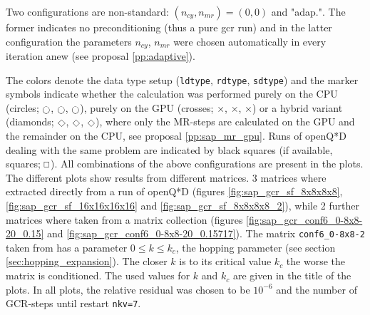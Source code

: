 \documentclass{article}
\DeclareRobustCommand{\diamond}{%
  \mathbin{\text{\scalebox{.75}{\rotatebox[origin=c]{45}{$\Box$}}}}%
}
\DeclareRobustCommand{\msquare}{%
  \mathbin{\text{\scalebox{.75}{$\Box$}}}%
}
\DeclareRobustCommand{\mcirc}{%
  \mathbin{\text{\scalebox{.75}{$\bigcirc$}}}%
}
\theoremstyle{plain} %
\theoremstyle{convention} %
\theoremstyle{remark} %
\def\code#1{\texttt{#1}}
\numberwithin{equation}{section}
\begin{document}
Two configurations are non-standard: $(n_{cy}, n_{mr}) = (0,0)$ and "adap.". The former indicates no preconditioning (thus a pure \acrshort{gcr} run) and in the latter configuration the parameters $n_{cy}$, $n_{mr}$ were chosen automatically in every iteration anew (see proposal \ref{pp:adaptive}).


The colors denote the data type setup (\code{ldtype}, \code{rdtype}, \code{sdtype}) and the marker symbols indicate whether the calculation was performed purely on the CPU (circles; \textcolor{cbrown}{$\mcirc$}, \textcolor{cred}{$\mcirc$}, \textcolor{cblue}{$\mcirc$}), purely on the GPU (crosses; \textcolor{cbrown}{$\times$}, \textcolor{cred}{$\times$}, \textcolor{cblue}{$\times$}) or a hybrid variant (diamonds; \textcolor{cbrown}{$\diamond$}, \textcolor{cred}{$\diamond$}, \textcolor{cblue}{$\diamond$}), where only the MR-steps are calculated on the GPU and the remainder on the CPU, see proposal \ref{pp:sap_mr_gpu}. Runs of openQ*D dealing with the same problem are indicated by black squares (if available, squares; $\msquare$). All combinations of the above configurations are present in the plots. The different plots show results from different matrices. \num{3} matrices where extracted directly from a run of openQ*D (figures \ref{fig:sap_gcr_sf_8x8x8x8}, \ref{fig:sap_gcr_sf_16x16x16x16} and \ref{fig:sap_gcr_sf_8x8x8x8_2}), while \num{2} further matrices where taken from a matrix collection \cite{davis2011} (figures \ref{fig:sap_gcr_conf6_0-8x8-20_0.15} and \ref{fig:sap_gcr_conf6_0-8x8-20_0.15717}). The matrix \code{conf6\_0-8x8-2} taken from \cite{davis2011} has a parameter $0 \le k \le k_c$, the hopping parameter (see section \ref{sec:hopping_expansion}). The closer $k$ is to its critical value $k_c$ the worse the matrix is conditioned. The used values for $k$ and $k_c$ are given in the title of the plots. In all plots, the relative residual was chosen to be $10^{-6}$ and the number of GCR-steps until restart \code{nkv=7}.
\end{document}
